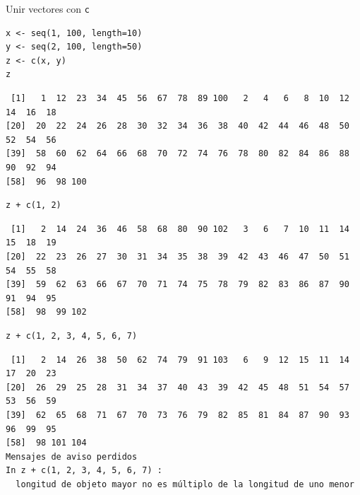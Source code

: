 \documentclass[xcolor={usenames,svgnames,dvipsnames}]{beamer}
\begin{document}
\begin{frame}[fragile,label=sec-2-1-5]{Unir vectores con \texttt{c}}
 \lstset{language=R,label= ,caption= ,numbers=none}
\begin{lstlisting}
x <- seq(1, 100, length=10)
y <- seq(2, 100, length=50)
z <- c(x, y)
z
\end{lstlisting}

\begin{verbatim}
 [1]   1  12  23  34  45  56  67  78  89 100   2   4   6   8  10  12  14  16  18
[20]  20  22  24  26  28  30  32  34  36  38  40  42  44  46  48  50  52  54  56
[39]  58  60  62  64  66  68  70  72  74  76  78  80  82  84  86  88  90  92  94
[58]  96  98 100
\end{verbatim}

\lstset{language=R,label= ,caption= ,numbers=none}
\begin{lstlisting}
z + c(1, 2)
\end{lstlisting}

\begin{verbatim}
 [1]   2  14  24  36  46  58  68  80  90 102   3   6   7  10  11  14  15  18  19
[20]  22  23  26  27  30  31  34  35  38  39  42  43  46  47  50  51  54  55  58
[39]  59  62  63  66  67  70  71  74  75  78  79  82  83  86  87  90  91  94  95
[58]  98  99 102
\end{verbatim}

\lstset{language=R,label= ,caption= ,numbers=none}
\begin{lstlisting}
z + c(1, 2, 3, 4, 5, 6, 7)
\end{lstlisting}

\begin{verbatim}
 [1]   2  14  26  38  50  62  74  79  91 103   6   9  12  15  11  14  17  20  23
[20]  26  29  25  28  31  34  37  40  43  39  42  45  48  51  54  57  53  56  59
[39]  62  65  68  71  67  70  73  76  79  82  85  81  84  87  90  93  96  99  95
[58]  98 101 104
Mensajes de aviso perdidos
In z + c(1, 2, 3, 4, 5, 6, 7) :
  longitud de objeto mayor no es múltiplo de la longitud de uno menor
\end{verbatim}
\end{frame}
\end{document}
